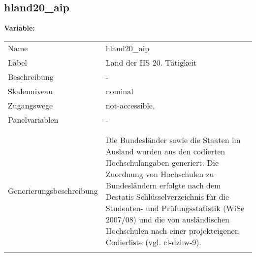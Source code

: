 	
	
	\subsection{hland20\_aip}
	\label{subSection:hland20_aip}

	\noindent\textbf{Variable:}\\
		\begin{tabular}{lL{11.3cm}}
			\label{tableVariable:hland20_aip}
			Name & hland20\_aip \\
			Label & Land der HS 20. Tätigkeit \\
			Beschreibung & - \\
			Skalenniveau & nominal \\
			Zugangswege &
				not-accessible,
 \\
			Panelvariablen & -
			 \\
			 \\
 \\
					Generierungsbeschreibung & Die Bundesländer sowie die Staaten im Ausland wurden aus den codierten Hochschulangaben generiert. Die Zuordnung von Hochschulen zu Bundesländern erfolgte nach dem Destatis Schlüsselverzeichnis für die Studenten- und Prüfungsstatistik (WiSe 2007/08) und die von ausländischen Hochschulen nach einer projekteigenen Codierliste (vgl. cl-dzhw-9).
				 \\	
			 \\
		\end{tabular}






	
	\newpage
